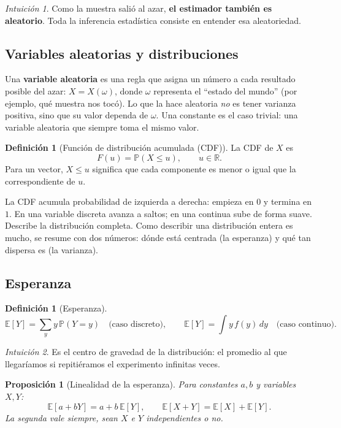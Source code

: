\documentclass[11pt,a4paper]{article}
\theoremstyle{plain}
\newtheorem{proposicion}[teorema]{Proposición}
\theoremstyle{definition}
\newtheorem{definicion}[teorema]{Definición}
\theoremstyle{remark}
\newtheorem*{intuicion}{Intuición}
\newcommand{\E}{\mathbb{E}}
\renewcommand{\P}{\mathbb{P}}
\newcommand{\R}{\mathbb{R}}
\begin{document}
\begin{intuicion}
Como la muestra salió al azar, \textbf{el estimador también es aleatorio}. Toda la inferencia
estadística consiste en entender esa aleatoriedad.
\end{intuicion}

\subsection{Variables aleatorias y distribuciones}

Una \textbf{variable aleatoria} es una regla que asigna un número a cada resultado posible del
azar: $X=X(\omega)$, donde $\omega$ representa el ``estado del mundo'' (por ejemplo, qué
muestra nos tocó). Lo que la hace aleatoria \emph{no} es tener varianza positiva, sino que su
valor dependa de $\omega$. Una constante es el caso trivial: una variable aleatoria que
siempre toma el mismo valor.

\begin{definicion}[Función de distribución acumulada (CDF)]\label{def:cdf}
La CDF de $X$ es
\[
F(u)=\P(X\le u),\qquad u\in\R .
\]
Para un vector, $X\le u$ significa que cada componente es menor o igual que la
correspondiente de $u$.
\end{definicion}

La CDF acumula probabilidad de izquierda a derecha: empieza en $0$ y termina en $1$. En una
variable discreta avanza a saltos; en una continua sube de forma suave. Describe la
distribución completa. Como describir una distribución entera es mucho, se resume con dos
números: dónde está centrada (la esperanza) y qué tan dispersa es (la varianza).

\subsection{Esperanza}

\begin{definicion}[Esperanza]\label{def:esperanza}
\[
\E[Y]=\sum_y y\,\P(Y=y)\quad\text{(caso discreto)},\qquad
\E[Y]=\int y\,f(y)\,dy\quad\text{(caso continuo)}.
\]
\end{definicion}

\begin{intuicion}
Es el centro de gravedad de la distribución: el promedio al que llegaríamos si repitiéramos
el experimento infinitas veces.
\end{intuicion}

\begin{proposicion}[Linealidad de la esperanza]\label{prop:linE}
Para constantes $a,b$ y variables $X,Y$:
\[
\E[a+bY]=a+b\,\E[Y],\qquad \E[X+Y]=\E[X]+\E[Y].
\]
La segunda vale siempre, sean $X$ e $Y$ independientes o no.
\end{proposicion}
\end{document}
